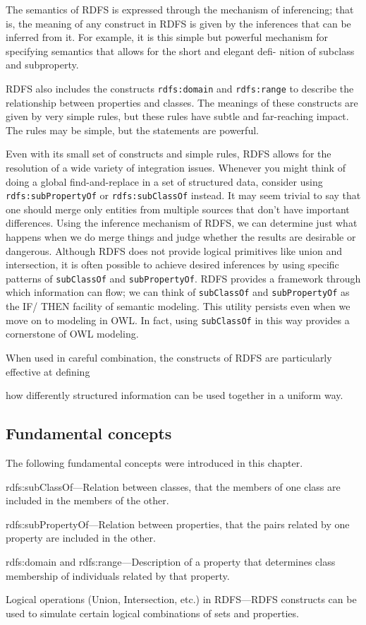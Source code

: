 The semantics of RDFS is expressed through the mechanism of inferencing;
that is, the meaning of any construct in RDFS is given by the inferences
that can be inferred from it. For example, it is this simple but
powerful mechanism for specifying semantics that allows for the short
and elegant defi- nition of subclass and subproperty.

RDFS also includes the constructs \texttt{rdfs:domain} and \texttt{rdfs:range} to describe
the relationship between properties and classes. The meanings of these
constructs are given by very simple rules, but these rules have subtle
and far-reaching impact. The rules may be simple, but the statements are
powerful.

Even with its small set of constructs and simple rules, RDFS allows for
the resolution of a wide variety of integration issues. Whenever you
might think of doing a global find-and-replace in a set of structured
data, consider using \texttt{rdfs:subPropertyOf} or \texttt{rdfs:subClassOf} instead. It
may seem trivial to say that one should merge only entities from
multiple sources that don't have important differences. Using the
inference mechanism of RDFS, we can determine just what happens when we
do merge things and judge whether the results are desirable or
dangerous. Although RDFS does not provide logical primitives like union
and intersection, it is often possible to achieve desired inferences by
using specific patterns of \texttt{subClassOf} and \texttt{subPropertyOf}. RDFS provides a
framework through which information can flow; we can think of \texttt{subClassOf}
and \texttt{subPropertyOf} as the IF/ THEN facility of semantic modeling. This
utility persists even when we move on to modeling in OWL. In fact, using
\texttt{subClassOf} in this way provides a cornerstone of OWL modeling.

When used in careful combination, the constructs of RDFS are
particularly effective at defining

how differently structured information can be used together in a uniform
way.

\subsection{Fundamental concepts}

The following fundamental concepts were introduced in this chapter.

rdfs:subClassOf---Relation between classes, that the members of one
class are included in the members of the other.

rdfs:subPropertyOf---Relation between properties, that the pairs related
by one property are included in the other.

rdfs:domain and rdfs:range---Description of a property that determines
class membership
of individuals related by that property.

Logical operations (Union, Intersection, etc.) in RDFS---RDFS constructs
can be used to simulate certain logical combinations of sets and
properties.
